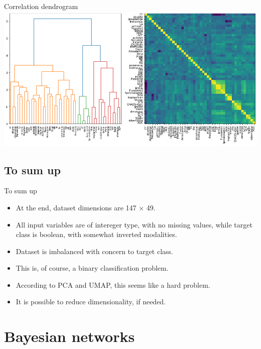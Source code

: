 \documentclass[hyperref={bookmarks=false}]{beamer}
\begin{document}
\begin{frame}{Correlation dendrogram}
\includegraphics[width=\textwidth]{dendro.png}
\end{frame}

\subsection{To sum up}
\begin{frame}{To sum up}
\begin{itemize}
    \item At the end, dataset dimensions are 147 × 49.

    \item All input variables are of intereger type, with no missing values, while target class is boolean, with somewhat inverted modalities.

    \item Dataset is imbalanced with concern to target class.

    \item This is, of course, a binary classification problem.

    \item According to PCA and UMAP, this seems like a hard problem.
    
    \item It is possible to reduce dimensionality, if needed.
\end{itemize}
\end{frame}

\section{Bayesian networks}
\end{document}
